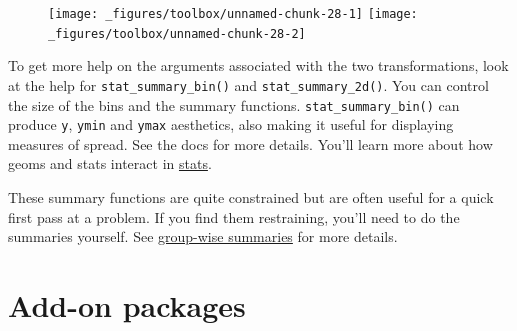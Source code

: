 \begin{Shaded}
\begin{Highlighting}[]
\StringTok{ }
\StringTok{  }\NormalTok{(} \NormalTok{, } \NormalTok{) +}\StringTok{ }
\StringTok{  }\NormalTok{(}\NormalTok{, }\NormalTok{) +}\StringTok{ }
\StringTok{  }\NormalTok{(}\NormalTok{, }\NormalTok{)}

 \StringTok{ }
\StringTok{  }\NormalTok{(} \NormalTok{, } \NormalTok{, } 
     \NormalTok{) +}\StringTok{ }
\StringTok{  }\NormalTok{(}\NormalTok{, }\NormalTok{) +}\StringTok{ }
\StringTok{  }\NormalTok{(}\NormalTok{, }\NormalTok{)}
\end{Highlighting}
\end{Shaded}

\begin{figure}[H]
  \texttt{[image: \_figures/toolbox/unnamed-chunk-28-1]}%
  \texttt{[image: \_figures/toolbox/unnamed-chunk-28-2]}
\end{figure}

To get more help on the arguments associated with the two
transformations, look at the help for \texttt{stat\_summary\_bin()} and
\texttt{stat\_summary\_2d()}. You can control the size of the bins and
the summary functions. \texttt{stat\_summary\_bin()} can produce
\texttt{y}, \texttt{ymin} and \texttt{ymax} aesthetics, also making it
useful for displaying measures of spread. See the docs for more details.
You'll learn more about how geoms and stats interact in
\protect\hyperlink{sec:stat}{stats}.

These summary functions are quite constrained but are often useful for a
quick first pass at a problem. If you find them restraining, you'll need
to do the summaries yourself. See
\protect\hyperlink{sec:summarise}{group-wise summaries} for more
details.

\hypertarget{sec:elsewhere}{\section{Add-on
packages}\label{sec:elsewhere}}

